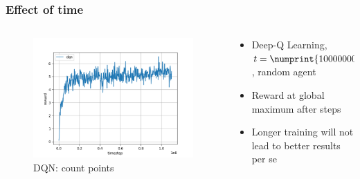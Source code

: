 \begin{frame}
\frametitle{Effect of time}

\begin{columns}[c]

\begin{column}{.5\textwidth}
\begin{figure}
\includegraphics[width=\textwidth]{dqn_custom-payoff_result_long-run.png}
\caption{DQN: count points}
\end{figure}
\end{column}

\begin{column}{.5\textwidth}
\begin{itemize}
\item Deep-Q Learning, $t = \numprint{100000000}$, random agent
\item Reward at global maximum after  steps
\item Longer training will not lead to better results per se
\end{itemize}
\end{column}

\end{columns}

\end{frame}


